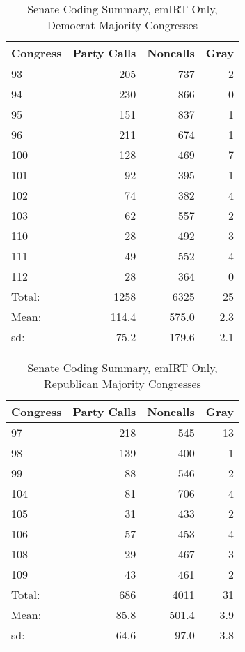 \documentclass[12pt]{article}
\begin{document}
\begin{table}[ht]
	\caption{Senate Coding Summary, emIRT Only, Democrat Majority Congresses}
	\centering
	\begin{tabular}{lrrr}
		\hline
		Congress & Party Calls & Noncalls & Gray \\ 
		\hline
		93 & 205 & 737 &   2 \\ 
		94 & 230 & 866 &   0 \\ 
		95 & 151 & 837 &   1 \\ 
		96 & 211 & 674 &   1 \\ 
		100 & 128 & 469 &   7 \\ 
		101 &  92 & 395 &   1 \\ 
		102 &  74 & 382 &   4 \\ 
		103 &  62 & 557 &   2 \\ 
		110 &  28 & 492 &   3 \\ 
		111 &  49 & 552 &   4 \\ 
		112 &  28 & 364 &   0 \\ 
		\hline
		Total: & 1258 & 6325 & 25 \\
		Mean: & 114.4 & 575.0 & 2.3 \\
		sd: & 75.2 & 179.6 & 2.1 \\
		\hline
	\end{tabular}
\end{table}

\begin{table}[ht]
	\caption{Senate Coding Summary, emIRT Only, Republican Majority Congresses}
	\centering
	\begin{tabular}{lrrr}
		\hline
		Congress & Party Calls & Noncalls & Gray \\ 
		\hline
		97 & 218 & 545 &  13 \\ 
		98 & 139 & 400 &   1 \\ 
		99 &  88 & 546 &   2 \\ 
		104 &  81 & 706 &   4 \\ 
		105 &  31 & 433 &   2 \\ 
		106 &  57 & 453 &   4 \\ 
		108 &  29 & 467 &   3 \\ 
		109 &  43 & 461 &   2 \\ 
		\hline
		Total: & 686 & 4011 & 31 \\
		Mean: & 85.8 & 501.4 & 3.9 \\
		sd: & 64.6 & 97.0 & 3.8 \\
		\hline
	\end{tabular}
\end{table}
\end{document}
